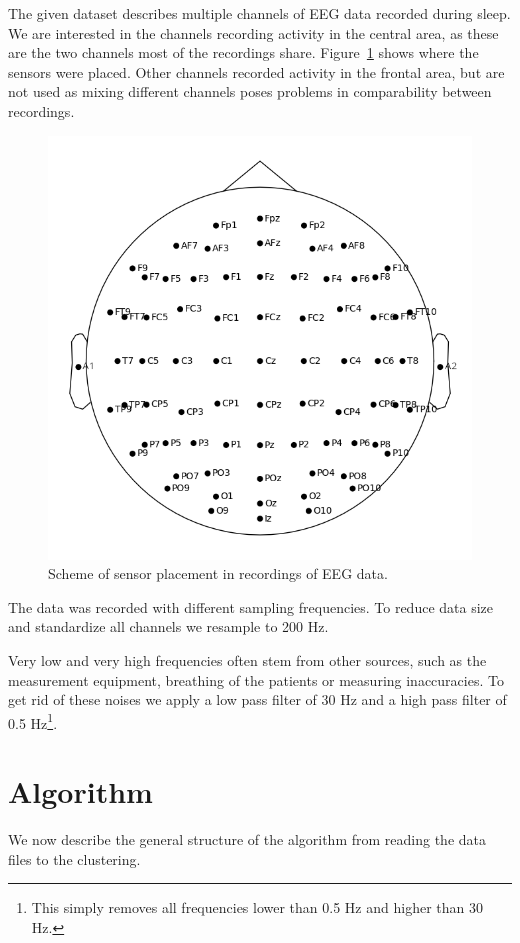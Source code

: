 The given dataset describes multiple channels of EEG data recorded during sleep. We are interested in the channels recording activity in the central area, as these are the two channels most of the recordings share. Figure~\ref{fig:head_placement} shows where the sensors were placed. Other channels recorded activity in the frontal area, but are not used as mixing different channels poses problems in comparability between recordings.

\begin{figure}
	\centering
	\includegraphics[width=0.7\linewidth]{figs/head_placement}
	\caption{Scheme of sensor placement in recordings of EEG data.}
	\label{fig:head_placement}
\end{figure}

The data was recorded with different sampling frequencies. To reduce data size and standardize all channels we resample to 200 Hz.

Very low and very high frequencies often stem from other sources, such as the measurement equipment, breathing of the patients or measuring inaccuracies. To get rid of these noises we apply a low pass filter of 30 Hz and a high pass filter of 0.5 Hz\footnote{This simply removes all frequencies lower than 0.5 Hz and higher than 30 Hz.}.

\section{Algorithm}
\label{sec:algorithm}

We now describe the general structure of the algorithm from reading the data files to the clustering.

